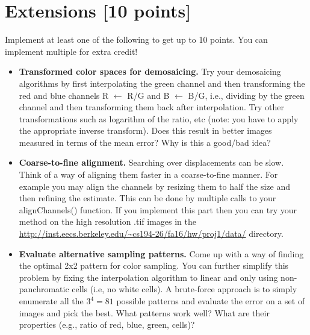 \documentclass[10pt,letterpaper]{article}
\begin{document}
\newpage
\section{Extensions [10 points]}
Implement at least one of the following to get up to 10 points. You can implement multiple for extra credit!

\begin{itemize}
\item \textbf{Transformed color spaces for demosaicing.} Try your demosaicing algorithms by first interpolating the green channel and then transforming the red and blue channels R $\leftarrow$ R/G and B $\leftarrow$ B/G, i.e., dividing by the green channel and then transforming them back after interpolation. Try other transformations such as logarithm of the ratio, etc (note: you have to apply the appropriate inverse transform). Does this result in better images measured in terms of the mean error? Why is this a good/bad idea? 

\item \textbf{Coarse-to-fine alignment.} Searching over displacements can be slow. Think of a way of aligning them faster in a coarse-to-fine manner. For example you may align the channels by resizing them to half the size and then refining the estimate. This can be done by multiple calls to your alignChannels() function. If you implement this part then you can try your method on the high resolution .tif images in the \url{http://inst.eecs.berkeley.edu/~cs194-26/fa16/hw/proj1/data/} directory.

\item \textbf{Evaluate alternative sampling patterns.} Come up with a way of finding the optimal 2x2 pattern for color sampling. You can further simplify this problem by fixing the interpolation algorithm to linear and only using non-panchromatic cells (i.e, no white cells). A brute-force approach is to simply enumerate all the $3^4 = 81$ possible patterns and evaluate the error on a set of images and pick the best. What patterns work well? What are their properties (e.g., ratio of red, blue, green, cells)?

\end{itemize}
\end{document}
